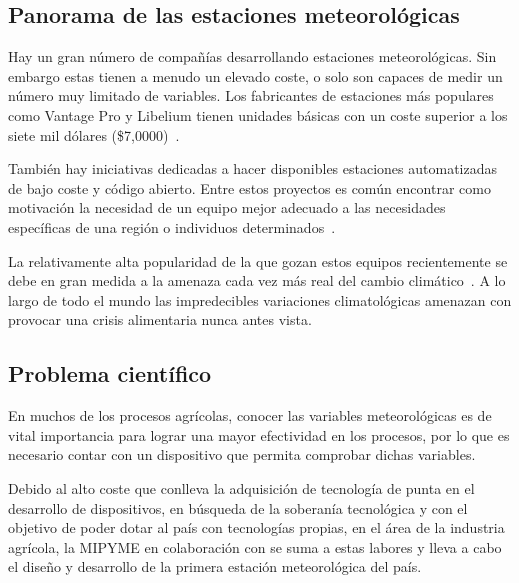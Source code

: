 \documentclass[12pt,letterpaper]{article}
\begin{document}
\begin{sloppypar}
        \subsection{Panorama de las estaciones
        meteorológicas}\label{subsec:estado-del-arte}
        Hay un gran número de compañías desarrollando estaciones meteorológicas.
        Sin embargo estas tienen a menudo un elevado coste, o solo son
        capaces de medir
        un número muy limitado de variables.
        Los fabricantes de estaciones más populares como Vantage Pro y
        Libelium tienen
        unidades básicas con un coste superior a los siete mil dólares
        (\$7,0000)~\cite{botero-valenciaLowCostClimate2022a}.

        También hay iniciativas dedicadas a hacer disponibles estaciones
        automatizadas
        de bajo coste y código abierto.
        Entre estos proyectos es común encontrar como motivación la necesidad
        de un
        equipo mejor adecuado a las necesidades específicas de una región o
        individuos
        determinados~\cite{bernardesPrototypingLowcostAutomatic2022,
            nettoOpensourceAutomaticWeather2019}.

        La relativamente alta popularidad de la que gozan estos equipos
        recientemente
        se debe en gran medida a la amenaza cada vez más real del cambio
        climático~\cite{zizingaClimateChangeMaize2022,
            ahmadHistoricalClimateChange2022, taoClimateWarmingOutweighed2022,
            aprakuClimateChangeSmallscale2021}.
        A lo largo de todo el mundo las impredecibles variaciones climatológicas
        amenazan con provocar una crisis alimentaria nunca antes
        vista\cite{ibrahimCombatingClimateChange2022,
            guoImpactClimateChange2022}.

        \subsection{Problema científico}\label{subsec:problema-cientifico}
        En muchos de los procesos agrícolas, conocer las variables
        meteorológicas es de
        vital importancia para lograr una mayor efectividad en los procesos,
        por lo que
        es necesario contar con un dispositivo que permita comprobar dichas
        variables.

        Debido al alto coste que conlleva la adquisición de tecnología de
        punta en el
        desarrollo de dispositivos, en búsqueda de la soberanía tecnológica y
        con el
        objetivo de poder dotar al país con tecnologías propias, en el área
        de la
        industria agrícola, la MIPYME \espoleta en colaboración con \client
        se suma a
        estas labores y lleva a cabo el diseño y desarrollo de la primera
        estación
        meteorológica del país.


\end{sloppypar}
\end{document}
